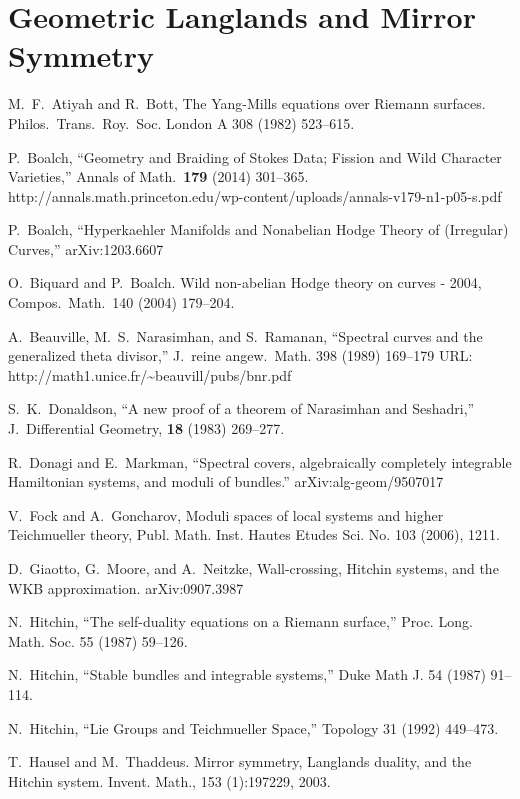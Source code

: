 \documentclass[oneside,english]{amsbook}
\numberwithin{section}{chapter}
\numberwithin{equation}{section}
\numberwithin{figure}{section}
\theoremstyle{plain}
\theoremstyle{definition}
\theoremstyle{remark}
\theoremstyle{definition}
\theoremstyle{definition}
\theoremstyle{plain}
\begin{document}
\chapter{Geometric Langlands and Mirror Symmetry}
\begin{thebibliography}{BNR}
M.~F.~Atiyah and R.~Bott, The Yang-Mills equations
over Riemann surfaces. Philos.~Trans.~Roy.~Soc. London A 308 (1982)
523--615.

P.~Boalch, ``Geometry and Braiding of Stokes Data;
Fission and Wild Character Varieties,'' Annals of Math.~\textbf{179}
(2014) 301--365. http://annals.math.princeton.edu/wp-content/uploads/annals-v179-n1-p05-s.pdf 

P.~Boalch, ``Hyperkaehler Manifolds and Nonabelian
Hodge Theory of (Irregular) Curves,'' arXiv:1203.6607

O.~Biquard and P.~Boalch. Wild non-abelian Hodge
theory on curves - 2004, Compos.~Math.~140 (2004) 179--204.

A.~Beauville, M.~S.~Narasimhan, and S.~Ramanan,
``Spectral curves and the generalized theta divisor,'' J.~reine
angew.~Math. 398 (1989) 169--179 URL: http://math1.unice.fr/\textasciitilde{}beauvill/pubs/bnr.pdf

S.~K.~Donaldson, ``A new proof of a theorem of Narasimhan
and Seshadri,'' J.~Differential Geometry, \textbf{18} (1983) 269--277.

R.~Donagi and E.~Markman, ``Spectral covers, algebraically
completely integrable Hamiltonian systems, and moduli of bundles.''
arXiv:alg-geom/9507017

V.~Fock and A.~Goncharov, Moduli spaces of local
systems and higher Teichmueller theory, Publ. Math. Inst. Hautes Etudes
Sci. No. 103 (2006), 1\textendash{}211. 

 D.~Giaotto, G.~Moore, and A.~Neitzke, Wall-crossing,
Hitchin systems, and the WKB approximation. arXiv:0907.3987

N.~Hitchin, ``The self-duality equations on a Riemann
surface,'' Proc. Long. Math. Soc. 55 (1987) 59--126. 

N.~Hitchin, ``Stable bundles and integrable systems,''
Duke Math J. 54 (1987) 91--114. 

N.~Hitchin, ``Lie Groups and Teichmueller Space,''
Topology 31 (1992) 449--473. 

T.~Hausel and M.~Thaddeus. Mirror symmetry, Langlands
duality, and the Hitchin system. Invent. Math., 153 (1):197\textendash{}229,
2003. 


\end{thebibliography}
\end{document}

